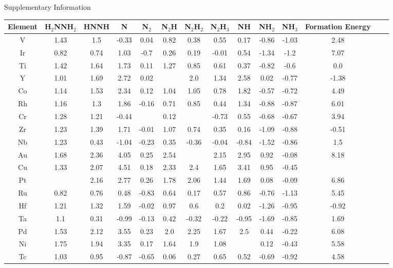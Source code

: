 Supplementary Information
\onecolumn
\begin{table}
\begin{center}
\begin{tabular}{| c | c | c | c | c | c | c | c | c | c | c | c | c | c |}
\hline
Element & H$_2$NNH$_2$ & HNNH & N & N$_2$ & N$_2$H & N$_2$H$_2$ & N$_2$H$_3$ & NH & NH$_2$ & NH$_3$ & Formation Energy & \\
\hline

V & 1.43 & 1.5 & -0.33 & 0.04 & 0.82 & 0.38 & 0.55 & 0.17 & -0.86 & -1.03 & 2.48 \\
Ir & 0.82 & 0.74 & 1.03 & -0.7 & 0.26 & 0.19 & -0.01 & 0.54 & -1.34 & -1.2 & 7.07 \\
Ti & 1.42 & 1.64 & 1.73 & 0.11 & 1.27 & 0.85 & 0.61 & 0.37 & -0.82 & -0.6 & 0.0 \\
Y & 1.01 & 1.69 & 2.72 & 0.02 &  & 2.0 & 1.34 & 2.58 & 0.02 & -0.77 & -1.38 \\
Co & 1.14 & 1.53 & 2.34 & 0.12 & 1.04 & 1.05 & 0.78 & 1.82 & -0.57 & -0.72 & 4.49 \\
Rh & 1.16 & 1.3 & 1.86 & -0.16 & 0.71 & 0.85 & 0.44 & 1.34 & -0.88 & -0.87 & 6.01 \\
Cr & 1.28 & 1.21 & -0.44 &  & 0.12 &  & -0.73 & 0.55 & -0.68 & -0.67 & 3.94 \\
Zr & 1.23 & 1.39 & 1.71 & -0.01 & 1.07 & 0.74 & 0.35 & 0.16 & -1.09 & -0.88 & -0.51 \\
Nb & 1.23 & 0.43 & -1.04 & -0.23 & 0.35 & -0.36 & -0.04 & -0.84 & -1.52 & -0.86 & 1.5 \\
Au & 1.68 & 2.36 & 4.05 & 0.25 & 2.54 &  & 2.15 & 2.95 & 0.92 & -0.08 & 8.18 \\
Cu & 1.33 & 2.07 & 4.51 & 0.18 & 2.33 & 2.4 & 1.65 & 3.41 & 0.95 & -0.45 &  \\
Pt &  & 2.16 & 2.77 & 0.26 & 1.78 & 2.06 & 1.44 & 1.69 & 0.08 & -0.09 & 6.86 \\
Ru & 0.82 & 0.76 & 0.48 & -0.83 & 0.64 & 0.17 & 0.57 & 0.86 & -0.76 & -1.13 & 5.45 \\
Hf & 1.21 & 1.32 & 1.59 & -0.02 & 0.97 & 0.6 & 0.2 & 0.02 & -1.26 & -0.95 & -0.92 \\
Ta & 1.1 & 0.31 & -0.99 & -0.13 & 0.42 & -0.32 & -0.22 & -0.95 & -1.69 & -0.85 & 1.69 \\
Pd & 1.53 & 2.12 & 3.55 & 0.23 & 2.0 & 2.25 & 1.67 & 2.5 & 0.44 & -0.22 & 6.08 \\
Ni & 1.75 & 1.94 & 3.35 & 0.17 & 1.64 & 1.9 & 1.08 &  & 0.12 & -0.43 & 5.58 \\
Tc & 1.03 & 0.95 & -0.87 & -0.65 & 0.06 & 0.27 & 0.65 & 0.52 & -0.69 & -0.92 & 4.58 \\

\end{tabular}
\end{center}
\end{table}
